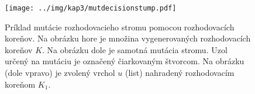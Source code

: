 \begin{figure}[h]
\centering
\centerline{\mbox{\texttt{[image: ../img/kap3/mutdecisionstump.pdf]}}}
\caption{Príklad mutácie rozhodovacieho stromu pomocou rozhodovacích koreňov. Na obrázku hore je množina vygenerovaných rozhodovacích koreňov $K$. Na obrázku dole je samotná mutácia stromu. Uzol určený na mutáciu je označený čiarkovaným štvorcom. Na obrázku (dole vpravo) je zvolený vrchol $u$ (list) nahradený rozhodovacím koreňom $K_1$. }\label{fig:mutdecisionstump}
\end{figure}